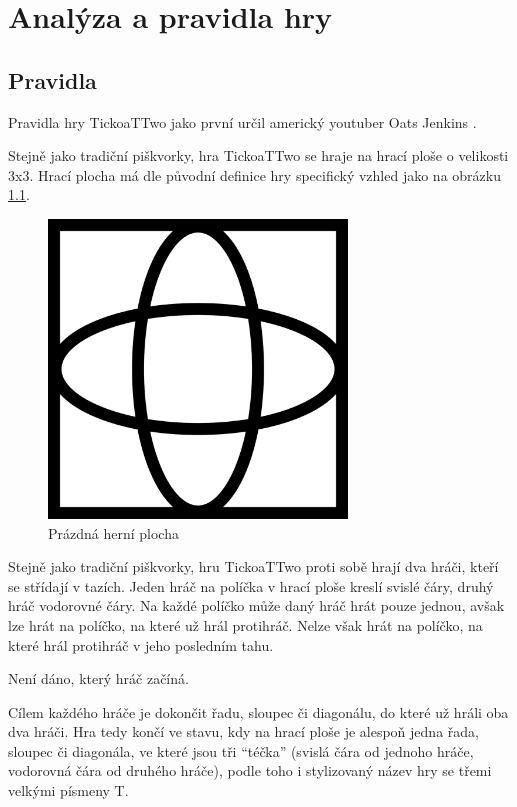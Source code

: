 \chapter{Analýza a pravidla hry}

\section{Pravidla}
Pravidla hry TickoaTTwo jako první určil americký youtuber Oats Jenkins \cite{jenkins22}.

Stejně jako tradiční piškvorky, hra TickoaTTwo se hraje na hrací ploše o
velikosti 3x3. Hrací plocha má dle původní definice hry specifický vzhled jako
na obrázku \ref{fig:empty-board}.

\begin{figure}[h]
    \centering
    \includegraphics[width=300px]{img/empty-board.png}
    \caption{Prázdná herní plocha}
    \label{fig:empty-board}
\end{figure}

Stejně jako tradiční piškvorky, hru TickoaTTwo proti sobě hrají dva hráči,
kteří se střídají v tazích. Jeden hráč na políčka v hrací ploše kreslí svislé
čáry, druhý hráč vodorovné čáry. Na každé políčko může daný hráč hrát pouze
jednou, avšak lze hrát na políčko, na které už hrál protihráč. Nelze však hrát
na políčko, na které hrál protihráč v jeho posledním tahu.

Není dáno, který hráč začíná.

Cílem každého hráče je dokončit řadu, sloupec či diagonálu, do které už hráli
oba dva hráči. Hra tedy končí ve stavu, kdy na hrací ploše je alespoň jedna
řada, sloupec či diagonála, ve které jsou tři \enquote{téčka} (svislá čára od
jednoho hráče, vodorovná čára od druhého hráče), podle toho i stylizovaný název
hry se třemi velkými písmeny T.


